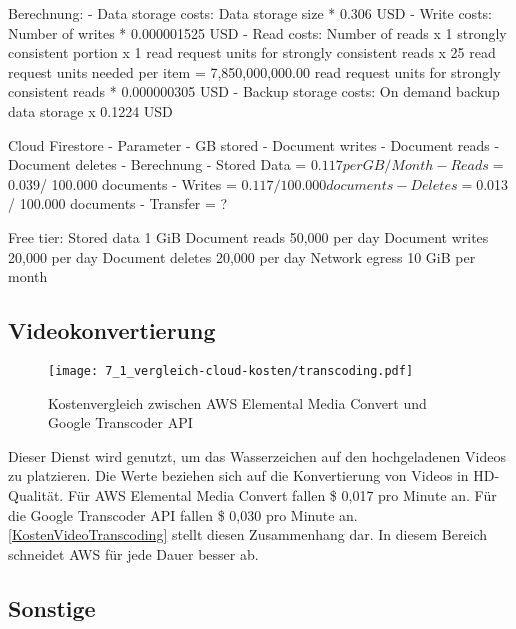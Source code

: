 Berechnung:
- Data storage costs: Data storage size * 0.306 USD
- Write costs: Number of writes * 0.000001525 USD
- Read costs: Number of reads x 1 strongly consistent portion x 1 read request units for strongly consistent reads x 25 read request units needed per item = 7,850,000,000.00 read request units for strongly consistent reads * 0.000000305 USD
- Backup storage costs: On demand backup data storage x 0.1224 USD



Cloud Firestore
- Parameter
    - GB stored
    - Document writes
    - Document reads
    - Document deletes
- Berechnung
    - Stored Data  = $0.117 per GB/ Month
    - Reads = $0.039/ 100.000 documents
    - Writes = $0.117 / 100.000 documents
    - Deletes = $0.013 / 100.000 documents
    - Transfer = ?

Free tier:
    Stored data	1 GiB
    Document reads	50,000 per day
    Document writes	20,000 per day
    Document deletes	20,000 per day
    Network egress	10 GiB per month


\subsection{Videokonvertierung}

\begin{figure}
  \centering
  \texttt{[image: 7\_1\_vergleich-cloud-kosten/transcoding.pdf]}
  \caption{Kostenvergleich zwischen AWS Elemental Media Convert und Google Transcoder API}
  \label{KostenVideoTranscoding}
\end{figure}

Dieser Dienst wird genutzt, um das Wasserzeichen auf den hochgeladenen Videos zu platzieren. Die Werte beziehen sich auf die Konvertierung von Videos in HD-Qualität. Für \ac{AWS} Elemental Media Convert fallen \$ 0,017 pro Minute an. Für die Google Transcoder API fallen \$ 0,030 pro Minute an. \autoref{KostenVideoTranscoding} stellt diesen Zusammenhang dar. In diesem Bereich schneidet \ac{AWS} für jede Dauer besser ab.

\subsection{Sonstige}

